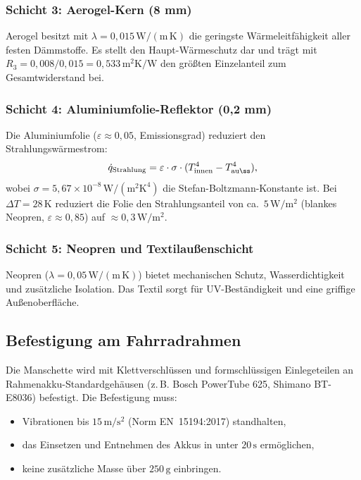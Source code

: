 ﻿\documentclass[a4paper,12pt]{article}
\theoremstyle{definition}
\begin{document}
\subsubsection{Schicht 3: Aerogel-Kern (8 mm)}

Aerogel besitzt mit $\lambda = 0{,}015\,\mathrm{W/(m\,K)}$ die geringste W\"armeleitf\"ahigkeit aller festen Dämmstoffe. Es stellt den Haupt-W\"armeschutz dar und tr\"agt mit $R_3 = 0{,}008/0{,}015 = 0{,}533\,\mathrm{m^2 K/W}$ den gr\"o\ss{}ten Einzelanteil zum Gesamtwiderstand bei.

\subsubsection{Schicht 4: Aluminiumfolie-Reflektor (0,2 mm)}

Die Aluminiumfolie ($\varepsilon \approx 0{,}05$, Emissionsgrad) reduziert den Strahlungsw\"armestrom:
\[
  \dot{q}_\mathrm{Strahlung} = \varepsilon \cdot \sigma \cdot (T_\mathrm{innen}^4 - T_\mathrm{au\ss}^4),
\]
wobei $\sigma = 5{,}67 \times 10^{-8}\,\mathrm{W/(m^2 K^4)}$ die Stefan-Boltzmann-Konstante ist. Bei $\Delta T = 28\,\mathrm{K}$ reduziert die Folie den Strahlungsanteil von ca.\ $5\,\mathrm{W/m^2}$ (blankes Neopren, $\varepsilon \approx 0{,}85$) auf $\approx 0{,}3\,\mathrm{W/m^2}$.

\subsubsection{Schicht 5: Neopren und Textilau\ss{}enschicht}

Neopren ($\lambda = 0{,}05\,\mathrm{W/(m\,K)}$) bietet mechanischen Schutz, Wasserdichtigkeit und zus\"atzliche Isolation. Das Textil sorgt f\"ur UV-Best\"andigkeit und eine griffige Au\ss{}enoberfl\"ache.

\subsection{Befestigung am Fahrradrahmen}

Die Manschette wird mit Klettverschl\"ussen und formschl\"ussigen Einlegeteilen an Rahmenak\-ku-Standardgeh\"ausen (z.\,B. Bosch PowerTube 625, Shimano BT-E8036) befestigt. Die Befestigung muss:
\begin{itemize}
  \item Vibrationen bis $15\,\mathrm{m/s^2}$ (Norm EN~15194:2017) standhalten,
  \item das Einsetzen und Entnehmen des Akkus in unter $20\,\mathrm{s}$ erm\"oglichen,
  \item keine zus\"atzliche Masse \"uber $250\,\mathrm{g}$ einbringen.
\end{itemize}
\end{document}
